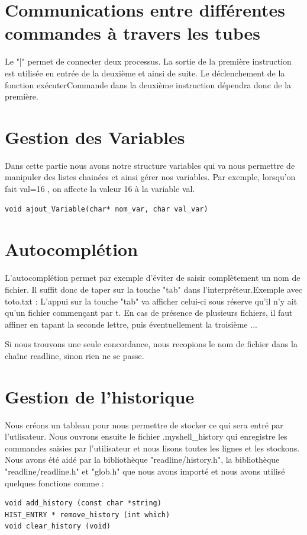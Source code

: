 \section{Communications entre différentes commandes à travers les tubes}
Le "|" permet de connecter deux processus. La sortie de la première instruction est utilisée en entrée de la deuxième et ainsi de suite. Le déclenchement de la fonction exécuterCommande dans la deuxième instruction dépendra donc de la première.

\section{Gestion des Variables}
Dans cette partie nous avons notre structure variables qui va nous permettre de manipuler des listes chainées et ainsi gérer nos variables. Par exemple, lorsqu'on fait val=16 , on affecte la valeur 16 à la variable val. 
\begin{lstlisting}[frame=single]
void ajout_Variable(char* nom_var, char val_var)
\end{lstlisting}

\section{Autocomplétion}
L'autocomplétion permet par exemple d'éviter de saisir complètement un nom de fichier. Il suffit donc de taper sur la touche "tab" dans l'interpréteur.Exemple avec toto.txt : L'appui sur la touche "tab" va afficher celui-ci sous réserve qu'il n'y ait qu'un fichier commençant par t. En cas de présence de plusieurs fichiers, il faut affiner en tapant la seconde lettre, puis éventuellement la troisième ...

Si nous trouvons une seule concordance, nous recopions le nom de fichier dans la chaîne readline, sinon rien ne se passe.

\section{Gestion de l'historique}

Nous créons un tableau pour nous permettre de stocker ce qui sera entré par l'utlisateur. Nous ouvrons  ensuite le fichier .myshell\_history qui enregistre les commandes saisies par l'utilisateur et nous lisons toutes les lignes et les stockons. Nous avons été aidé par la bibliothèque "readline/history.h", la bibliothèque "readline/readline.h" et "glob.h" que nous avons importé et nous avons utilisé quelques fonctions comme : 
\\
\begin{lstlisting}[frame=single]
void add_history (const char *string)
HIST_ENTRY * remove_history (int which)
void clear_history (void)
\end{lstlisting}


